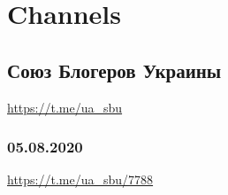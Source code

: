 \documentclass[a4paper,11pt]{book}
\newif\ifDEBUG
\begin{document}
\vspace{0.5cm}
 {\ifDEBUG\small\LaTeX~section: \verb|telegram| project: \verb|letopis| rootid: \verb|texdocs|	\fi}
\vspace{0.5cm}

 
 

\section{Channels}

\vspace{0.5cm}
 {\ifDEBUG\small\LaTeX~section: \verb|tg.ch| project: \verb|letopis| rootid: \verb|texdocs|	\fi}
\vspace{0.5cm}

 
 
\subsection{Союз Блогеров Украины}
\url{https://t.me/ua_sbu}
  
\vspace{0.5cm}
 {\ifDEBUG\small\LaTeX~section: \verb|tg.ch.souz_blogerov_ukrainy| project: \verb|letopis| rootid: \verb|texdocs|	\fi}
\vspace{0.5cm}

 
 
\subsubsection{05.08.2020}
\url{https://t.me/ua_sbu/7788}
  
\vspace{0.5cm}
 {\ifDEBUG\small\LaTeX~section: \verb|tg.ch.souz_blogerov_ukrainy.05_08_2020| project: \verb|letopis| rootid: \verb|texdocs|	\fi}
\vspace{0.5cm}
  
\end{document}
